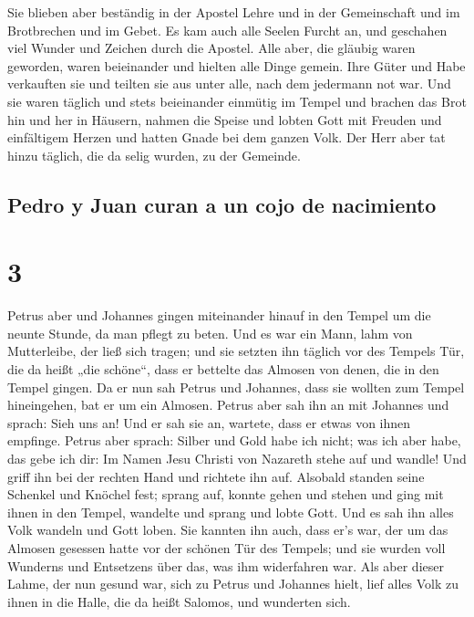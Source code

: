  Sie blieben aber beständig in der Apostel Lehre und in
der Gemeinschaft und im Brotbrechen und im Gebet.  Es kam
auch alle Seelen Furcht an, und geschahen viel Wunder und Zeichen durch
die Apostel.  Alle aber, die gläubig waren geworden,
waren beieinander und hielten alle Dinge gemein.  Ihre
Güter und Habe verkauften sie und teilten sie aus unter alle, nach dem
jedermann not war.  Und sie waren täglich und stets
beieinander einmütig im Tempel und brachen das Brot hin und her in
Häusern,  nahmen die Speise und lobten Gott mit Freuden
und einfältigem Herzen und hatten Gnade bei dem ganzen Volk. Der Herr
aber tat hinzu täglich, die da selig wurden, zu der Gemeinde.

\hypertarget{pedro-y-juan-curan-a-un-cojo-de-nacimiento}{%
\subsection{Pedro y Juan curan a un cojo de
nacimiento}\label{pedro-y-juan-curan-a-un-cojo-de-nacimiento}}

\hypertarget{section-2}{%
\section{3}\label{section-2}}

 Petrus aber und Johannes gingen miteinander hinauf in den
Tempel um die neunte Stunde, da man pflegt zu beten.  Und
es war ein Mann, lahm von Mutterleibe, der ließ sich tragen; und sie
setzten ihn täglich vor des Tempels Tür, die da heißt „die schöne``,
dass er bettelte das Almosen von denen, die in den Tempel gingen.
 Da er nun sah Petrus und Johannes, dass sie wollten zum
Tempel hineingehen, bat er um ein Almosen.  Petrus aber
sah ihn an mit Johannes und sprach: Sieh uns an!  Und er
sah sie an, wartete, dass er etwas von ihnen empfinge. 
Petrus aber sprach: Silber und Gold habe ich nicht; was ich aber habe,
das gebe ich dir: Im Namen Jesu Christi von Nazareth stehe auf und
wandle!  Und griff ihn bei der rechten Hand und richtete
ihn auf. Alsobald standen seine Schenkel und Knöchel fest;
 sprang auf, konnte gehen und stehen und ging mit ihnen in
den Tempel, wandelte und sprang und lobte Gott.  Und es
sah ihn alles Volk wandeln und Gott loben.  Sie kannten
ihn auch, dass er's war, der um das Almosen gesessen hatte vor der
schönen Tür des Tempels; und sie wurden voll Wunderns und Entsetzens
über das, was ihm widerfahren war.  Als aber dieser
Lahme, der nun gesund war, sich zu Petrus und Johannes hielt, lief alles
Volk zu ihnen in die Halle, die da heißt Salomos, und wunderten sich.

